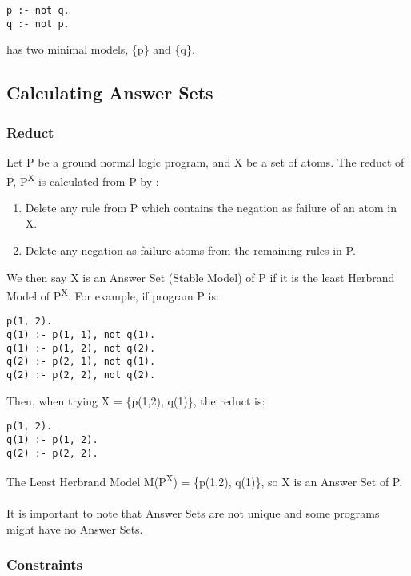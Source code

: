 \begin{lstlisting}
p :- not q.
q :- not p.
\end{lstlisting}

has two minimal models, \{p\} and \{q\}.

\subsection{Calculating Answer Sets}

\subsubsection{Reduct}

Let P be a ground normal logic program, and X be a set of atoms. The reduct of P, P\textsuperscript{X} is calculated from P by :

\begin{enumerate}
\item Delete any rule from P which contains the negation as failure of an atom in X.
\item Delete any negation as failure atoms from the remaining rules in P.
\end{enumerate}

We then say X is an Answer Set (Stable Model) of P if it is the least Herbrand Model of  P\textsuperscript{X}. For example, if program P is:

\begin{lstlisting}
p(1, 2).
q(1) :- p(1, 1), not q(1).
q(1) :- p(1, 2), not q(2).
q(2) :- p(2, 1), not q(1).
q(2) :- p(2, 2), not q(2).
\end{lstlisting}

Then, when trying X = \{p(1,2), q(1)\}, the reduct is:

\begin{lstlisting}
p(1, 2).
q(1) :- p(1, 2).
q(2) :- p(2, 2).
\end{lstlisting}

The Least Herbrand Model M(P\textsuperscript{X}) = \{p(1,2), q(1)\}, so X is an Answer Set of P. \\ \\

It is important to note that Answer Sets are not unique and some programs might have no Answer Sets.

\subsubsection{Constraints}

